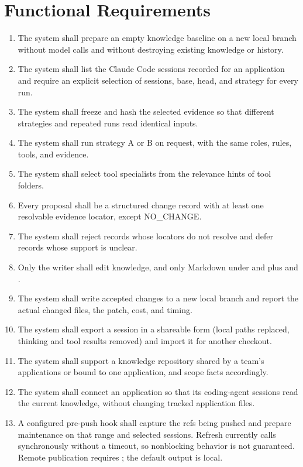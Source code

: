 \section{Functional Requirements}

\begin{enumerate}[label=FR\arabic*., leftmargin=3em, nosep]
  \item The system shall prepare an empty knowledge baseline on a new local branch without model calls and without destroying existing knowledge or history.
  \item The system shall list the Claude Code sessions recorded for an application and require an explicit selection of sessions, base, head, and strategy for every run.
  \item The system shall freeze and hash the selected evidence so that different strategies and repeated runs read identical inputs.
  \item The system shall run strategy A or B on request, with the same roles, rules, tools, and evidence.
  \item The system shall select tool specialists from the relevance hints of tool folders.
  \item Every proposal shall be a structured change record with at least one resolvable evidence locator, except NO\_CHANGE.
  \item The system shall reject records whose locators do not resolve and defer records whose support is unclear.
  \item Only the writer shall edit knowledge, and only Markdown under  and  plus  and .
  \item The system shall write accepted changes to a new local branch and report the actual changed files, the patch, cost, and timing.
  \item The system shall export a session in a shareable form (local paths replaced, thinking and tool results removed) and import it for another checkout.
  \item The system shall support a knowledge repository shared by a team's applications or bound to one application, and scope facts accordingly.
  \item The system shall connect an application so that its coding-agent sessions read the current knowledge, without changing tracked application files.
  \item A configured pre-push hook shall capture the refs being pushed and prepare maintenance on that range and selected sessions. Refresh currently calls  synchronously without a timeout, so nonblocking behavior is not guaranteed. Remote publication requires ; the default output is local.
\end{enumerate}

